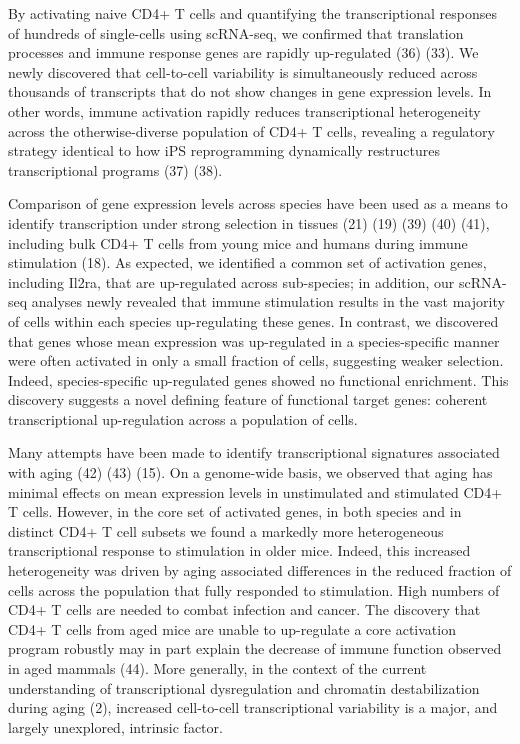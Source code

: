 By activating naive CD4+ T cells and quantifying the transcriptional responses of hundreds of single-cells using scRNA-seq, we confirmed that translation processes and immune response genes are rapidly up-regulated (36) (33). We newly discovered that cell-to-cell variability is simultaneously reduced across thousands of transcripts that do not show changes in gene expression levels. In other words, immune activation rapidly reduces transcriptional heterogeneity across the otherwise-diverse population of CD4+ T cells, revealing a regulatory strategy identical to how iPS reprogramming dynamically restructures transcriptional programs (37) (38). 

Comparison of gene expression levels across species have been used as a means to identify transcription under strong selection in tissues (21) (19) (39) (40) (41), including bulk CD4+ T cells from young mice and humans during immune stimulation (18). As expected, we identified a common set of activation genes, including Il2ra, that are up-regulated across sub-species; in addition, our scRNA-seq analyses newly revealed that immune stimulation results in the vast majority of cells within each species up-regulating these genes. In contrast, we discovered that genes whose mean expression was up-regulated in a species-specific manner were often activated in only a small fraction of cells, suggesting weaker selection. Indeed, species-specific up-regulated genes showed no functional enrichment. This discovery suggests a novel defining feature of functional target genes: coherent transcriptional up-regulation across a population of cells. 

Many attempts have been made to identify transcriptional signatures associated with aging (42) (43) (15). On a genome-wide basis, we observed that aging has minimal effects on mean expression levels in unstimulated and stimulated CD4+ T cells. However, in the core set of activated genes, in both species and in distinct CD4+ T cell subsets we found a markedly more heterogeneous transcriptional response to stimulation in older mice. Indeed, this increased heterogeneity was driven by aging associated differences in the reduced fraction of cells across the population that fully responded to stimulation. High numbers of CD4+ T cells are needed to combat infection and cancer. The discovery that CD4+ T cells from aged mice are unable to up-regulate a core activation program robustly may in part explain the decrease of immune function observed in aged mammals (44). More generally, in the context of the current understanding of transcriptional dysregulation and chromatin destabilization during aging (2), increased cell-to-cell transcriptional variability is a major, and largely unexplored, intrinsic factor.



